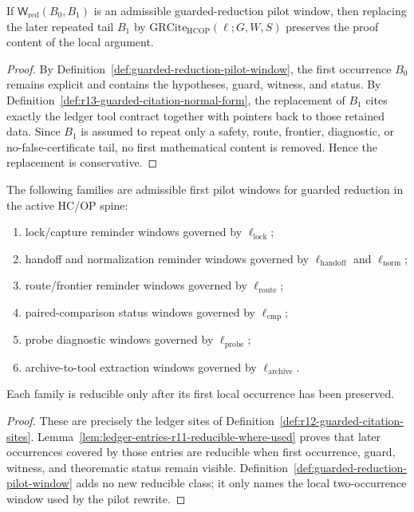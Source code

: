 \begin{lemma}
\label{lem:pilot-normal-form-is-conservative}
If \(\mathsf W_{\mathrm{red}}(B_0,B_1)\) is an admissible guarded-reduction pilot window, then replacing the later repeated tail \(B_1\) by \(\mathrm{GRCite}_{\mathrm{HCOP}}(\ell;G,W,S)\) preserves the proof content of the local argument.
\end{lemma}

\begin{proof}
By Definition~\ref{def:guarded-reduction-pilot-window}, the first occurrence \(B_0\) remains explicit and contains the hypotheses, guard, witness, and status. By Definition~\ref{def:r13-guarded-citation-normal-form}, the replacement of \(B_1\) cites exactly the ledger tool contract together with pointers back to those retained data. Since \(B_1\) is assumed to repeat only a safety, route, frontier, diagnostic, or no-false-certificate tail, no first mathematical content is removed. Hence the replacement is conservative.
\end{proof}

\begin{proposition}
\label{prop:allowed-pilot-windows-active-hcop-spine}
The following families are admissible first pilot windows for guarded reduction in the active HC/OP spine:
\begin{enumerate}[leftmargin=2em,label=(\roman*)]
  \item lock/capture reminder windows governed by \(\ell_{\mathrm{lock}}\);
  \item handoff and normalization reminder windows governed by \(\ell_{\mathrm{handoff}}\) and \(\ell_{\mathrm{norm}}\);
  \item route/frontier reminder windows governed by \(\ell_{\mathrm{route}}\);
  \item paired-comparison status windows governed by \(\ell_{\mathrm{cmp}}\);
  \item probe diagnostic windows governed by \(\ell_{\mathrm{probe}}\);
  \item archive-to-tool extraction windows governed by \(\ell_{\mathrm{archive}}\).
\end{enumerate}
Each family is reducible only after its first local occurrence has been preserved.
\end{proposition}

\begin{proof}
These are precisely the ledger sites of Definition~\ref{def:r12-guarded-citation-sites}. Lemma~\ref{lem:ledger-entries-r11-reducible-where-used} proves that later occurrences covered by those entries are reducible when first occurrence, guard, witness, and theorematic status remain visible. Definition~\ref{def:guarded-reduction-pilot-window} adds no new reducible class; it only names the local two-occurrence window used by the pilot rewrite.
\end{proof}

